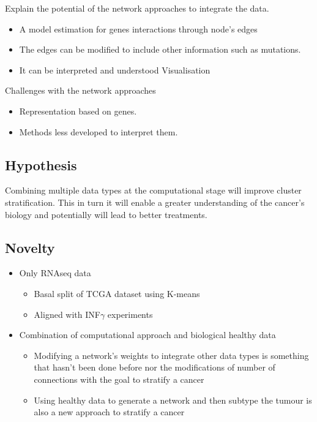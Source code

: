 Explain the potential of the network approaches to integrate the data.
\begin{itemize}
    \item A model estimation for genes interactions through node’s edges
    \item The edges can be modified to include other information such as mutations.
    \item It can be interpreted and understood 
    Visualisation
\end{itemize}

Challenges with the network approaches
\begin{itemize}
    \item Representation based on genes.
    \item Methods less developed to interpret them. 
\end{itemize}

\subsection{Hypothesis} 

Combining multiple data types at the computational stage will improve cluster stratification. This in turn it will enable a greater understanding of the cancer's biology and potentially will lead to better treatments.


\subsection{Novelty} 


\begin{itemize}
    \item Only RNAseq data
    \begin{itemize}
        \item Basal split of TCGA dataset using K-means 
        \item Aligned with INF$\gamma$ experiments
    \end{itemize}
    \item Combination of computational approach and biological healthy data
    \begin{itemize}
        \item Modifying a network's weights to integrate other data types is something that hasn’t been done before nor the modifications of number of connections with the goal to stratify a cancer 
        \item Using healthy data to generate a network and then subtype the tumour is also a new approach to stratify a cancer
    \end{itemize}
\end{itemize}


